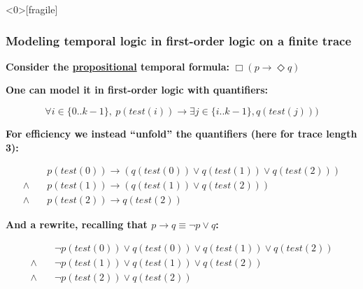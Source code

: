 \begin{frame}<0>[fragile]
  \frametitle{Modeling temporal logic in first-order logic on a finite trace} \small

{\bf Consider the \underline{propositional} temporal formula:} $\Box (p \rightarrow \Diamond q)$

\pause

\vspace{0.2cm}
{\bf One can model it in first-order logic with quantifiers:}

\[
\forall i \in \{0..k\!-\!1\},\ p(test(i)) 
  \rightarrow 
    \exists j \in \{i..k\!-\!1\}, q(test(j)))
\]

\pause

\vspace{0.2cm}
{\bf For efficiency we instead ``unfold'' the quantifiers (here for trace length 3):} 

\begin{align*}
&p(test(0)) \rightarrow (q(test(0)) \vee q(test(1)) \vee q(test(2))) \\
\wedge\quad &p(test(1)) \rightarrow (q(test(1)) \vee q(test(2))) \\
\wedge\quad &p(test(2)) \rightarrow q(test(2))
\end{align*}

\pause

\vspace{0.2cm}
{\bf And a rewrite, recalling that $p \rightarrow q \equiv \neg p \vee q$:}

\begin{align*}
&\neg p(test(0)) \vee q(test(0)) \vee q(test(1)) \vee q(test(2)) \\
\wedge\quad &\neg p(test(1)) \vee q(test(1)) \vee q(test(2)) \\
\wedge\quad &\neg p(test(2)) \vee q(test(2))
\end{align*}

\end{frame}


\newcommand{\isM}[1]{\mathtt{isM}(#1)}
\newcommand{\isR}[1]{\mathtt{isR}(#1)}
\newcommand{\Mdir}[1]{\mathtt{Mdir}(#1)}
\newcommand{\Mdist}[1]{\mathtt{Mdist}(#1)}
\newcommand{\Rangle}[1]{\mathtt{Rangle}(#1)}

